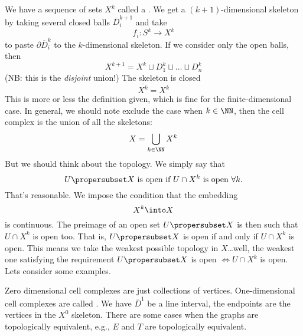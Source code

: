 We have a sequence of sets $X^{k}$ called a
. We get a $(k+1)$-dimensional
skeleton by taking several closed balls $\overline{D}^{k+1}_{i}$
and take
\begin{equation}
f_{i}\colon S^{k}\to X^{k}
\end{equation}
to paste $\partial\overline{D}^{k}_{i}$ to the $k$-dimensional
skeleton. If we consider only the open balls, then
\begin{equation}
X^{k+1}=X^{k}\sqcup D^{k}_{1}\sqcup\dots\sqcup D^{k}_{n}
\end{equation}
(NB: this is the \emph{disjoint} union!) The skeleton is closed
\begin{equation}
\overline{X^{k}}=X^{k}
\end{equation}
This is more or less the definition given, which is fine for the
finite-dimensional case. In general, we should note exclude the
case when $k\in\NN$, then the cell complex is the union of all
the skeletons:
\begin{equation}
X=\bigcup_{k\in\NN}X^{k}
\end{equation}
But we should think about the topology. We simply say that
\begin{equation}
U\propersubset X\mbox{ is open if }U\cap  X^{k}\mbox{ is open
}\forall k.
\end{equation}
That's reasonable. We impose the condition that the embedding
\begin{equation}
X^{k}\into X
\end{equation}
is continuous. The preimage of an open set $U\propersubset X$ is
then such that $U\cap X^{k}$ is open too. That is,
$U\propersubset X$ is open if and only if $U\cap X^{k}$ is
open. This means we take the weakest possible topology in
$X$\dots well, the weakest one satisfying the requirement
$U\propersubset X$ is open $\iff U\cap X^{k}$ is open. Lets
consider some examples. 

\begin{ex}
Zero dimensional cell complexes are just collections of
vertices. One-dimensional cell complexes are called
. We have $\overline{D}^{1}$ be a line interval,
the endpoints are the vertices in the $X^{0}$ skeleton. There are
some cases when the graphs are topologically equivalent, e.g.,
$E$ and $T$ are topologically equivalent.
\end{ex}

